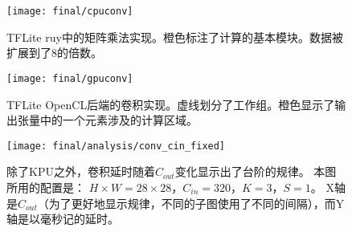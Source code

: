 \begin{figure}
    \centering
    \texttt{[image: final/cpuconv]}
    \caption{TFLite ruy中的矩阵乘法实现。橙色标注了计算的基本模块。数据被扩展到了8的倍数。}
    \label{fig:cpuconv}
\end{figure}

\begin{figure}
    \centering
    \texttt{[image: final/gpuconv]}
    \caption{TFLite OpenCL后端的卷积实现。虚线划分了工作组。橙色显示了输出张量中的一个元素涉及的计算区域。}
    \label{fig:gpuconv}
\end{figure}

\begin{figure}
	\centering
	\texttt{[image: final/analysis/conv\_cin\_fixed]}
	\caption{
        除了KPU之外，卷积延时随着$C_{out}$变化显示出了台阶的规律。
        本图所用的配置是：
        $H \times W=28 \times 28$，$C_{in}=320$，$K=3$，$S=1$。
        X轴是$C_{out}$（为了更好地显示规律，不同的子图使用了不同的间隔），而Y轴是以毫秒记的延时。
	}
	\label{fig:conv_cin_fixed}
\end{figure}